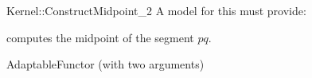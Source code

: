 \begin{ccRefFunctionObjectConcept}{Kernel::ConstructMidpoint_2}
A model for this must provide:


 {computes the midpoint of the segment $pq$.}

\ccRefines
AdaptableFunctor (with two arguments)

\ccSeeAlso
{}\\

\end{ccRefFunctionObjectConcept}
